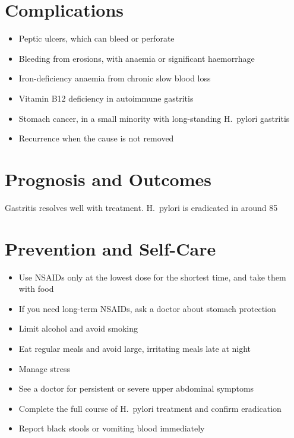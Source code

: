 \section*{Complications}
\begin{itemize}
    \item Peptic ulcers, which can bleed or perforate
    \item Bleeding from erosions, with anaemia or significant haemorrhage
    \item Iron-deficiency anaemia from chronic slow blood loss
    \item Vitamin B12 deficiency in autoimmune gastritis
    \item Stomach cancer, in a small minority with long-standing H.\ pylori gastritis
    \item Recurrence when the cause is not removed
\end{itemize}

\section*{Prognosis and Outcomes}
Gastritis resolves well with treatment. H.\ pylori is eradicated in around 85%

\section*{Prevention and Self-Care}
\begin{itemize}
    \item Use NSAIDs only at the lowest dose for the shortest time, and take them with food
    \item If you need long-term NSAIDs, ask a doctor about stomach protection
    \item Limit alcohol and avoid smoking
    \item Eat regular meals and avoid large, irritating meals late at night
    \item Manage stress
    \item See a doctor for persistent or severe upper abdominal symptoms
    \item Complete the full course of H.\ pylori treatment and confirm eradication
    \item Report black stools or vomiting blood immediately
\end{itemize}

